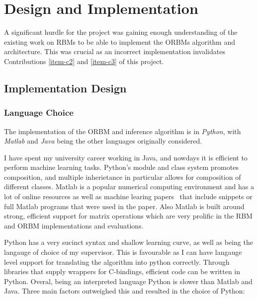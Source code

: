 \chapter{Design and Implementation}\label{C:work}

A significant hurdle for the project was gaining enough understanding of the existing work on RBMs to be able to implement the ORBMs algorithm and architecture. This was crucial as an incorrect implementation invalidates Contributions \ref{item-c2} and \ref{item-c3} of this project.


\section{Implementation Design}

\subsection{Language Choice}

The implementation of the ORBM and inference algorithm is in \emph{Python}, with \emph{Matlab} and \emph{Java} being the other languages originally considered.

I have spent my university career working in Java, and nowdays it is efficient to perform machine learning tasks. Python's module and class system promotes composition, and multiple inherietance in particular allows for composition of different classes. Matlab is a popular numerical computing environment and has a lot of online resources as well as machine learing papers~\cite{hinton2006reducing} that include snippets or full Matlab programs that were used in the paper. Also Matlab is built around strong, efficient support for matrix operations which are very prolific in the RBM and ORBM implementations and evaluations.

Python has a very sucinct syntax and shallow learning curve, as well as being the langauge of choice of my supervisor. This is favourable as I can have langauge level support for translating the algorithm into python correctly. Through libraries that supply wrappers for C-bindings, efficient code can be written in Python. Overal, being an interpreted language Python is slower than Matlab and Java. Three main factors outweighed this and resulted in the choice of Python:

